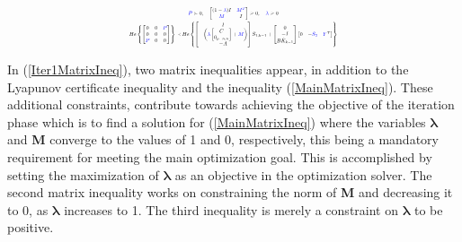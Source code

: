 \begin{equation}
\centering
\resizebox{0.48\textwidth}{!}{$
    \begin{gathered}
        \textcolor{blue}{P} \succ 0, \quad \begin{bmatrix}
            (1-\textcolor{blue}{\lambda})I & \textcolor{blue}{M^T}\\
            \textcolor{blue}{M} & I
        \end{bmatrix} \geq 0 ,\quad \textcolor{blue}{\lambda} \geq 0 \\
        He\left\{ \begin{bmatrix}
            0 & 0 & \textcolor{blue}{P}\\
            0 & 0 & 0\\
            \textcolor{blue}{P} & 0 & 0
        \end{bmatrix}\right\}
    \prec
    He\left\{\begin{bmatrix}
            I\\
            -\begin{pmatrix} \textcolor{blue}{\lambda}
            \begin{bmatrix}
                C\\
                0_{p-n,n}
            \end{bmatrix} +
            \textcolor{blue}{M}
            \end{pmatrix}\\
            -A
    \end{bmatrix}
    S_{1,k-1} +
    \begin{bmatrix}
         0\\
        -I\\
        B \hat{K}_{k-1}
    \end{bmatrix}
    \begin{bmatrix}
        0 & -\textcolor{blue}{S_2} & \textcolor{blue}{Y}^T
\end{bmatrix}\right\}
    \end{gathered}$}
    \label{Iter1MatrixIneq}
\end{equation}

In (\ref{Iter1MatrixIneq}), two matrix inequalities appear, in addition to the Lyapunov certificate inequality and the inequality (\ref{MainMatrixIneq}). These additional constraints, contribute towards achieving the objective of the iteration phase which is to find a solution for (\ref{MainMatrixIneq}) where the variables $\pmb{\lambda}$ and \textbf{M} converge to the values of 1 and 0, respectively, this being a mandatory requirement for meeting the main optimization goal. This is accomplished by setting the maximization of $\pmb{\lambda}$ as an objective in the optimization solver. The second matrix inequality works on constraining the norm of \textbf{M} and decreasing it to 0, as $\pmb{\lambda}$ increases to 1. The third inequality is merely a constraint on $\pmb{\lambda}$ to be positive.

